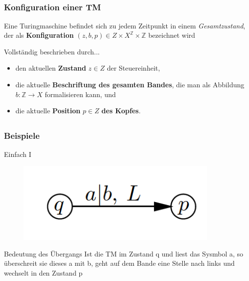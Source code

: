 \subsection*{}
\begin{frame}
  \frametitle{Konfiguration einer TM}
Eine Turingmaschine befindet sich zu jedem Zeitpunkt in einem \textit{Gesamtzustand}, der als \textbf{Konfiguration} $(z, b, p) \in Z \times X^\mathbb{Z} \times \mathbb{Z}$ bezeichnet wird
\begin{block}{Vollständig beschrieben durch...}
\begin{itemize}
  \pause
	\item den aktuellen \textbf{Zustand} $z \in Z$ der Steuereinheit,
	\pause
	\item die aktuelle \textbf{Beschriftung des gesamten Bandes}, die man als Abbildung $b: \mathbb{Z} \rightarrow X$ formalisieren kann, und
	\pause
	\item die aktuelle \textbf{Position} $p \in Z$ \textbf{des Kopfes}.
\end{itemize}
\end{block}
\end{frame}

\subsection*{}
\begin{frame}
  \frametitle{Beispiele}
\begin{block}{Einfach I}
\begin{figure}
	\centering
		\includegraphics[height=4cm]{src/tut12_einfachI.png}
\end{figure}
\end{block}
\pause
 \begin{block}{Bedeutung des Übergangs}
 Ist die TM im Zustand q und liest das Sysmbol a, so überschreit sie dieses a mit b, geht auf dem Bande eine Stelle nach links und wechselt in den Zustand p
\end{block}
\end{frame}

